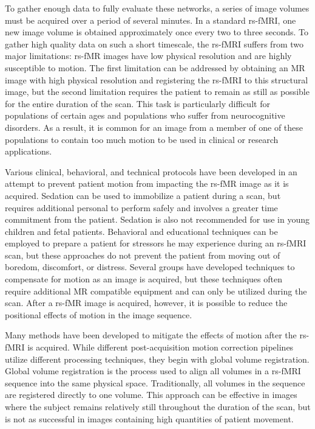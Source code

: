 To gather enough data to fully evaluate these networks, a series of image volumes must be acquired over a period of several minutes. In a standard rs-fMRI, one new image volume is obtained approximately once every two to three seconds. To gather high quality data on such a short timescale, the rs-fMRI suffers from two major limitations: rs-fMR images have low physical resolution and are highly susceptible to motion. The first limitation can be addressed by obtaining an MR image with high physical resolution and registering the rs-fMRI to this structural image, but the second limitation requires the patient to remain as still as possible for the entire duration of the scan. This task is particularly difficult for populations of certain ages and populations who suffer from neurocognitive disorders. As a result, it is common for an image from a member of one of these populations to contain too much motion to be used in clinical or research applications.

Various clinical, behavioral, and technical protocols have been developed in an attempt to prevent patient motion from impacting the rs-fMR image as it is acquired. Sedation can be used to immobilize a patient during a scan, but requires additional personal to perform safely and involves a greater time commitment from the patient. Sedation is also not recommended for use in young children and fetal patients. Behavioral and educational techniques can be employed to prepare a patient for stressors he may experience during an rs-fMRI scan, but these approaches do not prevent the patient from moving out of boredom, discomfort, or distress. Several groups have developed techniques to compensate for motion as an image is acquired, but these techniques often require additional MR compatible equipment and can only be utilized during the scan. After a rs-fMR image is acquired, however, it is possible to reduce the positional effects of motion in the image sequence.

Many methods have been developed to mitigate the effects of motion after the rs-fMRI is acquired. While different post-acquisition motion correction pipelines utilize different processing techniques, they begin with global volume registration. Global volume registration is the process used to align all volumes in a rs-fMRI sequence into the same physical space. Traditionally, all volumes in the sequence are registered directly to one volume. This approach can be effective in images where the subject remains relatively still throughout the duration of the scan, but is not as successful in images containing high quantities of patient movement.

